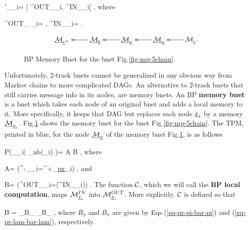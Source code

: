 \beq
\calm'_{\rvx_i}=
[
\calm^{OUT}_{\rvx_i},
\calm^{IN}_{\rvx_i}]
\;,
\eeq
where

\beq
\calm^{OUT}_{ \rvx_i}=
\;,
\;\;\;
\calm^{IN}_{\rvx_i}=
\;.
\eeq

\begin{figure}[h!]
$$\xymatrix{
\ucalm_{\rveps^+}
&
\ucalm_\rvb\ar[l]
&
\ucalm_\rvx\ar[l]
&
\ucalm_\rva\ar[l]
&
\calm_{\rveps^-}\ar[l]
}$$
\caption{BP Memory Bnet for the bnet
Fig.\ref{fig-mp-5chain}. }
\label{fig-mem-5chain}
\end{figure}

Unfortunately,
2-track bnets cannot be
 generalized in any
obvious way  from
Markov chains to more
complicated DAGs.
An alternative to 2-track bnets
that still
carries message
info in its nodes,
are memory bnets. An BP
{\bf memory bnet}
is a bnet
which takes each node
of an original
bnet and
adds a local memory to it.
More specifically,
it keeps that DAG
but replaces each node
$\rvx_i$
by a memory $\ucalm_{\rvx_i}$.
Fig.\ref{fig-mem-5chain} shows
the memory bnet for
the bnet Fig.\ref{fig-mp-5chain}.
The TPM, printed in blue,
for the  node $\ucalm_\rvx$
of the memory bnet
Fig.\ref{fig-mem-5chain}, is as follows

\beq\color{blue}
P(\calm_{\rvx_i}|
\calm_{\rvn\in nb(\rvx_i)}
)= A B
\;,
\eeq
where

\beq
A=
\indi(\calm^{-}_{\rvx_i}=\calm^{+}_{\ul{px}_i})
\;,
\eeq
and

\beq
B=
\indi(\calm^{OUT}_{\rvx_i}=\calc(\calm^{IN}_{\rvx_i}))
\label{eq-mp-update-static}
\;.
\eeq
The function ${\cal C}$,
which
we will call the {\bf BP local computation},
maps $\calm^{IN}_{\rvx_i}$
into $\calm^{OUT}_{\rvx_i}$. More explicitly,
${\cal C}$ is defined so that

\beq
B
=
_{B_\pi}
_{B_\pi}
\;,
\eeq
where
$B_\pi$ and $B_\pi$
are given by Eqs.(\ref{eq-pr-pi-bar-pi})
and (\ref{eq-pr-lam-bar-lam}),
respectively.



